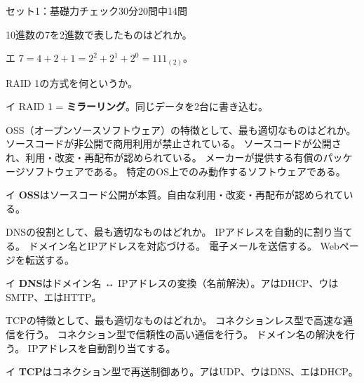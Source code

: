 \begin{mogishi}{セット1：基礎力チェック}{30分}{20問中14問}
\begin{itpmon}[\diffbadge{標}]{10進数の7を2進数で表したものはどれか。}
\end{itpmon}
\begin{kaisetsu}{エ}
$7 = 4 + 2 + 1 = 2^2 + 2^1 + 2^0 = 111_{(2)}$。
\end{kaisetsu}

\begin{itpmon}[\diffbadge{基}]{RAID 1の方式を何というか。}
\end{itpmon}
\begin{kaisetsu}{イ}
RAID 1 = \textbf{ミラーリング}。同じデータを2台に書き込む。
\end{kaisetsu}

\begin{itpmon}[\diffbadge{標}]{OSS（オープンソースソフトウェア）の特徴として、最も適切なものはどれか。}
\sentakushi
  {ソースコードが非公開で商用利用が禁止されている。}
  {ソースコードが公開され、利用・改変・再配布が認められている。}
  {メーカーが提供する有償のパッケージソフトウェアである。}
  {特定のOS上でのみ動作するソフトウェアである。}
\end{itpmon}
\begin{kaisetsu}{イ}
\textbf{OSS}はソースコード公開が本質。自由な利用・改変・再配布が認められている。
\end{kaisetsu}

\begin{itpmon}[\diffbadge{標}]{DNSの役割として、最も適切なものはどれか。}
\sentakushi
  {IPアドレスを自動的に割り当てる。}
  {ドメイン名とIPアドレスを対応づける。}
  {電子メールを送信する。}
  {Webページを転送する。}
\end{itpmon}
\begin{kaisetsu}{イ}
\textbf{DNS}はドメイン名 ↔ IPアドレスの変換（名前解決）。アはDHCP、ウはSMTP、エはHTTP。
\end{kaisetsu}

\begin{itpmon}[\diffbadge{標}]{TCPの特徴として、最も適切なものはどれか。}
\sentakushi
  {コネクションレス型で高速な通信を行う。}
  {コネクション型で信頼性の高い通信を行う。}
  {ドメイン名の解決を行う。}
  {IPアドレスを自動割り当てする。}
\end{itpmon}
\begin{kaisetsu}{イ}
\textbf{TCP}はコネクション型で再送制御あり。アはUDP、ウはDNS、エはDHCP。
\end{kaisetsu}


\end{mogishi}
